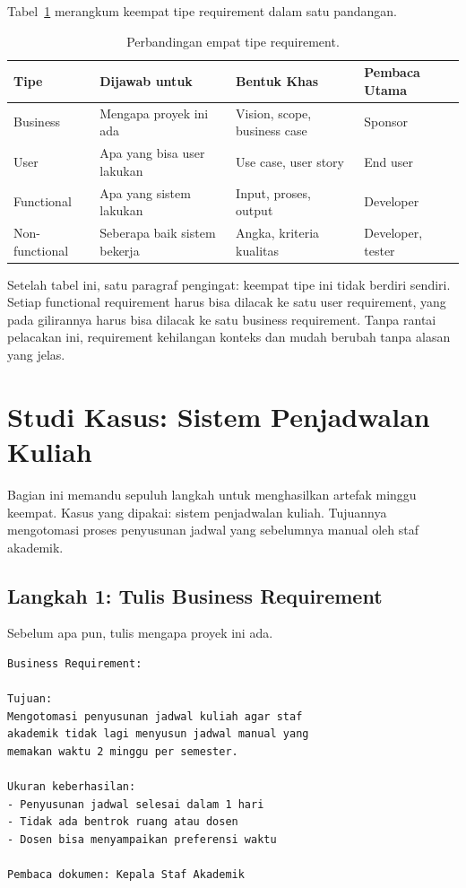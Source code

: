 \documentclass[11pt,a4paper]{article}
\begin{document}
Tabel~\ref{tab:summary} merangkum keempat tipe requirement dalam satu pandangan.

\begin{table}[H]
	\centering
	\caption{Perbandingan empat tipe requirement.}
	\label{tab:summary}
	\footnotesize
	\begin{tabularx}{\textwidth}{l X X X}
		\toprule
		Tipe           & Dijawab untuk                & Bentuk Khas                  & Pembaca Utama     \\
		\midrule
		Business       & Mengapa proyek ini ada       & Vision, scope, business case & Sponsor           \\
		User           & Apa yang bisa user lakukan   & Use case, user story         & End user          \\
		Functional     & Apa yang sistem lakukan      & Input, proses, output        & Developer         \\
		Non-functional & Seberapa baik sistem bekerja & Angka, kriteria kualitas     & Developer, tester \\
		\bottomrule
	\end{tabularx}
\end{table}

Setelah tabel ini, satu paragraf pengingat: keempat tipe ini tidak berdiri sendiri. Setiap functional requirement harus bisa dilacak ke satu user requirement, yang pada gilirannya harus bisa dilacak ke satu business requirement. Tanpa rantai pelacakan ini, requirement kehilangan konteks dan mudah berubah tanpa alasan yang jelas.

\section{Studi Kasus: Sistem Penjadwalan Kuliah}

Bagian ini memandu sepuluh langkah untuk menghasilkan artefak minggu keempat. Kasus yang dipakai: sistem penjadwalan kuliah. Tujuannya mengotomasi proses penyusunan jadwal yang sebelumnya manual oleh staf akademik.

\subsection{Langkah 1: Tulis Business Requirement}

Sebelum apa pun, tulis mengapa proyek ini ada.

\begin{lstlisting}[style=out]
Business Requirement:

Tujuan:
Mengotomasi penyusunan jadwal kuliah agar staf
akademik tidak lagi menyusun jadwal manual yang
memakan waktu 2 minggu per semester.

Ukuran keberhasilan:
- Penyusunan jadwal selesai dalam 1 hari
- Tidak ada bentrok ruang atau dosen
- Dosen bisa menyampaikan preferensi waktu

Pembaca dokumen: Kepala Staf Akademik
\end{lstlisting}
\end{document}
